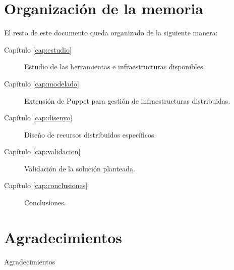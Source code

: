 \section{Organización de la memoria}

El resto de este documento queda organizado de la siguiente manera:
\begin{description}
\item[Capítulo \ref{cap:estudio}] Estudio de las herramientas e infraestructuras disponibles.
\item[Capítulo \ref{cap:modelado}] Extensión de Puppet para gestión de infraestructuras distribuidas.
\item[Capítulo \ref{cap:disenyo}] Diseño de recursos distribuidos específicos.
\item[Capítulo \ref{cap:validacion}] Validación de la solución planteada.
\item[Capítulo \ref{cap:conclusiones}] Conclusiones.
\end{description}


\section{Agradecimientos}

Agradecimientos
